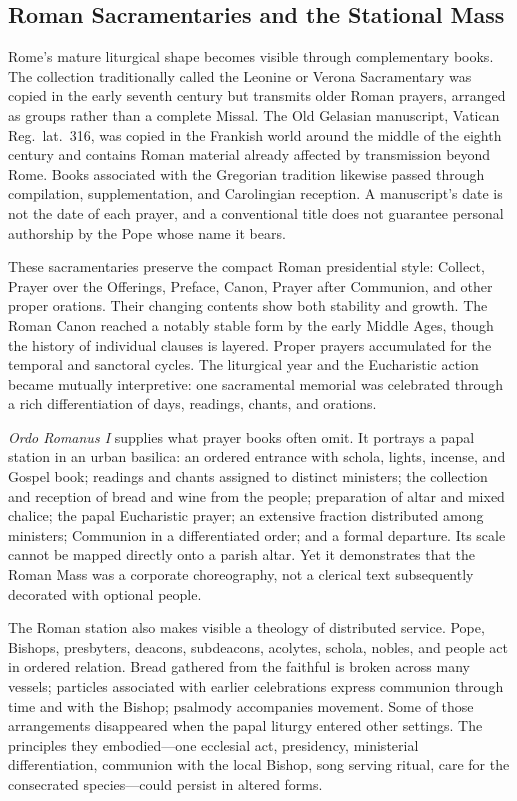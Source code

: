 \subsection{Roman Sacramentaries and the Stational Mass}

Rome's mature liturgical shape becomes visible through complementary books. The collection traditionally called the Leonine or Verona Sacramentary was copied in the early seventh century but transmits older Roman prayers, arranged as groups rather than a complete Missal. The Old Gelasian manuscript, Vatican Reg.~lat.~316, was copied in the Frankish world around the middle of the eighth century and contains Roman material already affected by transmission beyond Rome. Books associated with the Gregorian tradition likewise passed through compilation, supplementation, and Carolingian reception. A manuscript's date is not the date of each prayer, and a conventional title does not guarantee personal authorship by the Pope whose name it bears.

These sacramentaries preserve the compact Roman presidential style: Collect, Prayer over the Offerings, Preface, Canon, Prayer after Communion, and other proper orations. Their changing contents show both stability and growth. The Roman Canon reached a notably stable form by the early Middle Ages, though the history of individual clauses is layered. Proper prayers accumulated for the temporal and sanctoral cycles. The liturgical year and the Eucharistic action became mutually interpretive: one sacramental memorial was celebrated through a rich differentiation of days, readings, chants, and orations.

\emph{Ordo Romanus I} supplies what prayer books often omit. It portrays a papal station in an urban basilica: an ordered entrance with schola, lights, incense, and Gospel book; readings and chants assigned to distinct ministers; the collection and reception of bread and wine from the people; preparation of altar and mixed chalice; the papal Eucharistic prayer; an extensive fraction distributed among ministers; Communion in a differentiated order; and a formal departure. Its scale cannot be mapped directly onto a parish altar. Yet it demonstrates that the Roman Mass was a corporate choreography, not a clerical text subsequently decorated with optional people.

The Roman station also makes visible a theology of distributed service. Pope, Bishops, presbyters, deacons, subdeacons, acolytes, schola, nobles, and people act in ordered relation. Bread gathered from the faithful is broken across many vessels; particles associated with earlier celebrations express communion through time and with the Bishop; psalmody accompanies movement. Some of those arrangements disappeared when the papal liturgy entered other settings. The principles they embodied---one ecclesial act, presidency, ministerial differentiation, communion with the local Bishop, song serving ritual, care for the consecrated species---could persist in altered forms.

